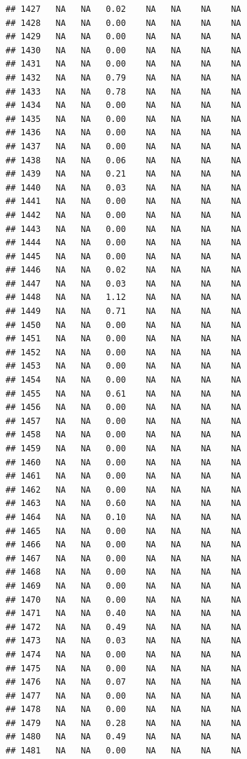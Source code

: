 \documentclass{article}\usepackage{graphicx, color}
\makeatletter
\newenvironment{kframe}{%
 \def\at@end@of@kframe{}%
 \ifinner\ifhmode%
  \def\at@end@of@kframe{\end{minipage}}%
  \begin{minipage}{\columnwidth}%
 \fi\fi%
 \def\FrameCommand##1{\hskip\@totalleftmargin \hskip-\fboxsep
 \colorbox{shadecolor}{##1}\hskip-\fboxsep
     \hskip-\linewidth \hskip-\@totalleftmargin \hskip\columnwidth}%
 \MakeFramed {\advance\hsize-\width
   \@totalleftmargin\z@ \linewidth\hsize
   \@setminipage}}%
 {\par\unskip\endMakeFramed%
 \at@end@of@kframe}
\newenvironment{knitrout}{}{} %
\makeatother
\begin{document}
\begin{knitrout}
\begin{kframe}
\begin{verbatim}
## 1427   NA   NA   0.02    NA   NA    NA    NA
## 1428   NA   NA   0.00    NA   NA    NA    NA
## 1429   NA   NA   0.00    NA   NA    NA    NA
## 1430   NA   NA   0.00    NA   NA    NA    NA
## 1431   NA   NA   0.00    NA   NA    NA    NA
## 1432   NA   NA   0.79    NA   NA    NA    NA
## 1433   NA   NA   0.78    NA   NA    NA    NA
## 1434   NA   NA   0.00    NA   NA    NA    NA
## 1435   NA   NA   0.00    NA   NA    NA    NA
## 1436   NA   NA   0.00    NA   NA    NA    NA
## 1437   NA   NA   0.00    NA   NA    NA    NA
## 1438   NA   NA   0.06    NA   NA    NA    NA
## 1439   NA   NA   0.21    NA   NA    NA    NA
## 1440   NA   NA   0.03    NA   NA    NA    NA
## 1441   NA   NA   0.00    NA   NA    NA    NA
## 1442   NA   NA   0.00    NA   NA    NA    NA
## 1443   NA   NA   0.00    NA   NA    NA    NA
## 1444   NA   NA   0.00    NA   NA    NA    NA
## 1445   NA   NA   0.00    NA   NA    NA    NA
## 1446   NA   NA   0.02    NA   NA    NA    NA
## 1447   NA   NA   0.03    NA   NA    NA    NA
## 1448   NA   NA   1.12    NA   NA    NA    NA
## 1449   NA   NA   0.71    NA   NA    NA    NA
## 1450   NA   NA   0.00    NA   NA    NA    NA
## 1451   NA   NA   0.00    NA   NA    NA    NA
## 1452   NA   NA   0.00    NA   NA    NA    NA
## 1453   NA   NA   0.00    NA   NA    NA    NA
## 1454   NA   NA   0.00    NA   NA    NA    NA
## 1455   NA   NA   0.61    NA   NA    NA    NA
## 1456   NA   NA   0.00    NA   NA    NA    NA
## 1457   NA   NA   0.00    NA   NA    NA    NA
## 1458   NA   NA   0.00    NA   NA    NA    NA
## 1459   NA   NA   0.00    NA   NA    NA    NA
## 1460   NA   NA   0.00    NA   NA    NA    NA
## 1461   NA   NA   0.00    NA   NA    NA    NA
## 1462   NA   NA   0.00    NA   NA    NA    NA
## 1463   NA   NA   0.60    NA   NA    NA    NA
## 1464   NA   NA   0.10    NA   NA    NA    NA
## 1465   NA   NA   0.00    NA   NA    NA    NA
## 1466   NA   NA   0.00    NA   NA    NA    NA
## 1467   NA   NA   0.00    NA   NA    NA    NA
## 1468   NA   NA   0.00    NA   NA    NA    NA
## 1469   NA   NA   0.00    NA   NA    NA    NA
## 1470   NA   NA   0.00    NA   NA    NA    NA
## 1471   NA   NA   0.40    NA   NA    NA    NA
## 1472   NA   NA   0.49    NA   NA    NA    NA
## 1473   NA   NA   0.03    NA   NA    NA    NA
## 1474   NA   NA   0.00    NA   NA    NA    NA
## 1475   NA   NA   0.00    NA   NA    NA    NA
## 1476   NA   NA   0.07    NA   NA    NA    NA
## 1477   NA   NA   0.00    NA   NA    NA    NA
## 1478   NA   NA   0.00    NA   NA    NA    NA
## 1479   NA   NA   0.28    NA   NA    NA    NA
## 1480   NA   NA   0.49    NA   NA    NA    NA
## 1481   NA   NA   0.00    NA   NA    NA    NA

\end{verbatim}
\end{kframe}
\end{knitrout}
\end{document}
